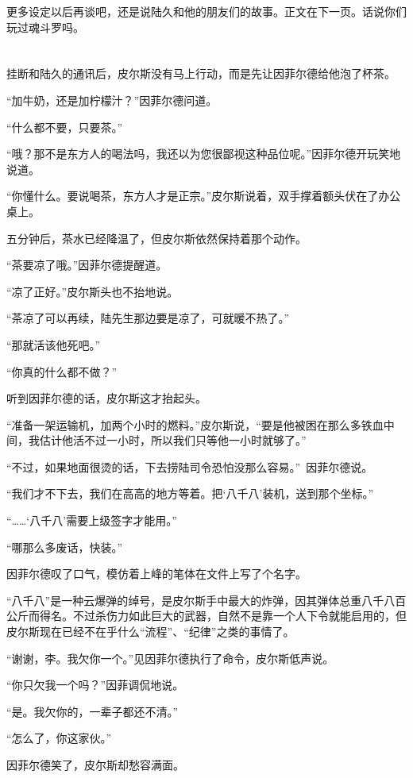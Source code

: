 更多设定以后再谈吧，还是说陆久和他的朋友们的故事。正文在下一页。话说你们玩过魂斗罗吗。

\section*{}

挂断和陆久的通讯后，皮尔斯没有马上行动，而是先让因菲尔德给他泡了杯茶。

“加牛奶，还是加柠檬汁？”因菲尔德问道。

“什么都不要，只要茶。”

“哦？那不是东方人的喝法吗，我还以为您很鄙视这种品位呢。”因菲尔德开玩笑地说道。

“你懂什么。要说喝茶，东方人才是正宗。”皮尔斯说着，双手撑着额头伏在了办公桌上。

五分钟后，茶水已经降温了，但皮尔斯依然保持着那个动作。

“茶要凉了哦。”因菲尔德提醒道。

“凉了正好。”皮尔斯头也不抬地说。

“茶凉了可以再续，陆先生那边要是凉了，可就暖不热了。”

“那就活该他死吧。”

“你真的什么都不做？”

听到因菲尔德的话，皮尔斯这才抬起头。

“准备一架运输机，加两个小时的燃料。”皮尔斯说，“要是他被困在那么多铁血中间，我估计他活不过一小时，所以我们只等他一小时就够了。”

“不过，如果地面很烫的话，下去捞陆司令恐怕没那么容易。” 因菲尔德说。

“我们才不下去，我们在高高的地方等着。把‘八千八’装机，送到那个坐标。”

“……‘八千八’需要上级签字才能用。” 

“哪那么多废话，快装。”

因菲尔德叹了口气，模仿着上峰的笔体在文件上写了个名字。

“八千八”是一种云爆弹的绰号，是皮尔斯手中最大的炸弹，因其弹体总重八千八百公斤而得名。不过杀伤力如此巨大的武器，自然不是靠一个人下令就能启用的，但皮尔斯现在已经不在乎什么“流程”、“纪律”之类的事情了。

“谢谢，李。我欠你一个。”见因菲尔德执行了命令，皮尔斯低声说。

“你只欠我一个吗？”因菲调侃地说。

“是。我欠你的，一辈子都还不清。”

“怎么了，你这家伙。”

因菲尔德笑了，皮尔斯却愁容满面。

